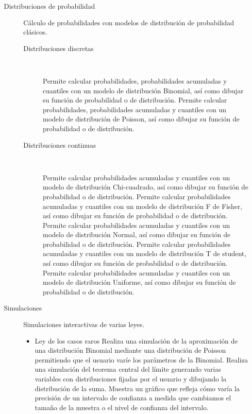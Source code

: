 \documentclass[10pt,twoside,spanish]{article}
\numberwithin{equation}{section}
\begin{document}
\begin{description}
\item[Distribuciones de probabilidad] Cálculo de probabilidades con modelos de distribución de probabilidad clásicos. 
\begin{description}
\item[Distribuciones discretas] \hfill\\[-1\baselineskip] 
\begin{itemize}
 Permite calcular probabilidades, probabilidades acumuladas y cuantiles con un modelo de distribución Binomial, así como
dibujar su función de probabilidad o de distribución.
 Permite calcular probabilidades, probabilidades acumuladas y cuantiles con un modelo de distribución de Poisson, así como
dibujar su función de probabilidad o de distribución.
\end{itemize}
\item[Distribuciones continuas] \hfill\\[-1\baselineskip] 
\begin{itemize} 
 Permite calcular probabilidades acumuladas y cuantiles con un modelo de distribución Chi-cuadrado, así como
dibujar su función de probabilidad o de distribución.
 Permite calcular probabilidades acumuladas y cuantiles con un modelo de distribución F de Fisher, así como
dibujar su función de probabilidad o de distribución.
 Permite calcular probabilidades acumuladas y cuantiles con un modelo de distribución Normal, así como
dibujar su función de probabilidad o de distribución.
 Permite calcular probabilidades acumuladas y cuantiles con un modelo de distribución T de student, así como
dibujar su función de probabilidad o de distribución.
 Permite calcular probabilidades acumuladas y cuantiles con un modelo de distribución Uniforme, así como
dibujar su función de probabilidad o de distribución.
\end{itemize}
\end{description}

\item[Simulaciones] Simulaciones interactivas de varias leyes. 
\begin{itemize}
\item{Ley de los casos raros} Realiza una simulación de la aproximación de una distribución Binomial mediante una distribución de Poisson
permitiendo que el usuario varíe los parámetros de la Binomial. 
 Realiza una simulación del teorema central del límite generando varias variables con distribuciones
fijadas por el usuario y dibujando la distribución de la suma.
 Muestra un gráfico que refleja cómo varía la precisión de un intervalo de confianza a medida
que cambiamos el tamaño de la muestra o el nivel de confianza del intervalo. 
\end{itemize}
\end{description}
\end{document}
